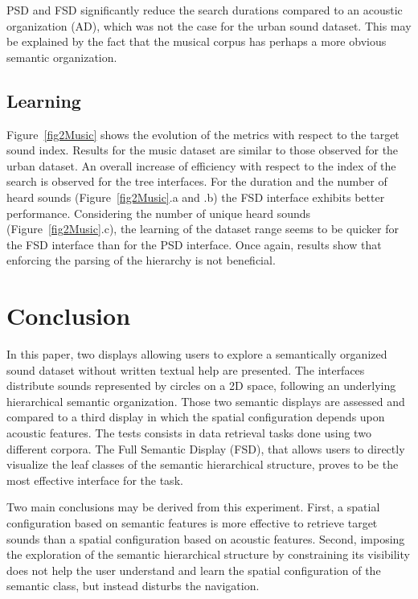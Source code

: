 \documentclass{aes2e}
\newcommand{\nm}[1]{\textcolor{magenta}{nm: #1}}
\begin{document}
PSD and FSD significantly reduce the search durations compared to an acoustic organization (AD), which was not the case for the urban sound dataset. This may be explained by the fact that the musical corpus has perhaps a more obvious semantic organization.

\subsection{Learning}

Figure~\ref{fig2Music} shows the evolution of the metrics with respect to the target sound index. Results for the music dataset are similar to those observed for the urban dataset. An overall increase of efficiency with respect to the index of the search is observed for the tree interfaces. For the duration and the number of heard sounds (Figure~\ref{fig2Music}.a and .b) the FSD interface exhibits better performance. Considering the number of unique heard sounds (Figure~\ref{fig2Music}.c), the learning of the dataset range seems to be quicker for the FSD interface than for the PSD interface. Once again, results show that enforcing the parsing of the hierarchy is not beneficial.

\section{Conclusion}


In this paper, two displays allowing users to explore a semantically organized sound dataset without written textual help are presented. The interfaces distribute sounds represented by circles on a 2D space, following an underlying hierarchical semantic organization. Those two semantic displays are assessed and compared to a third display in which the spatial configuration depends upon acoustic features. The tests consists in data retrieval tasks done using two different corpora. 
The Full Semantic Display (FSD), that allows users to directly visualize the leaf classes of the semantic hierarchical structure, proves to be the most effective interface for the task.

Two main conclusions may be derived from this experiment. First, a spatial configuration based on semantic features is more effective to retrieve target sounds than a spatial configuration based on acoustic features. Second, imposing the exploration of the semantic hierarchical structure by constraining its visibility does not help the user understand and learn the spatial configuration of the semantic class, but instead disturbs the navigation. 
\end{document}
